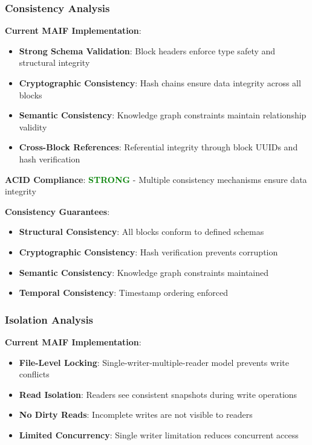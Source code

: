 \documentclass[conference]{IEEEtran}
\begin{document}
\begin{itemize}[leftmargin=*]
\subsubsection{Consistency Analysis}

\textbf{Current MAIF Implementation}:
\begin{itemize}[leftmargin=*]
\item \textbf{Strong Schema Validation}: Block headers enforce type safety and structural integrity
\item \textbf{Cryptographic Consistency}: Hash chains ensure data integrity across all blocks
\item \textbf{Semantic Consistency}: Knowledge graph constraints maintain relationship validity
\item \textbf{Cross-Block References}: Referential integrity through block UUIDs and hash verification
\end{itemize}

\textbf{ACID Compliance}: \textcolor{green}{\textbf{STRONG}} - Multiple consistency mechanisms ensure data integrity

\textbf{Consistency Guarantees}:
\begin{itemize}[leftmargin=*]
\item \textbf{Structural Consistency}: All blocks conform to defined schemas
\item \textbf{Cryptographic Consistency}: Hash verification prevents corruption
\item \textbf{Semantic Consistency}: Knowledge graph constraints maintained
\item \textbf{Temporal Consistency}: Timestamp ordering enforced
\end{itemize}

\subsubsection{Isolation Analysis}

\textbf{Current MAIF Implementation}:
\begin{itemize}[leftmargin=*]
\item \textbf{File-Level Locking}: Single-writer-multiple-reader model prevents write conflicts
\item \textbf{Read Isolation}: Readers see consistent snapshots during write operations
\item \textbf{No Dirty Reads}: Incomplete writes are not visible to readers
\item \textbf{Limited Concurrency}: Single writer limitation reduces concurrent access
\end{itemize}


\end{itemize}
\end{document}
